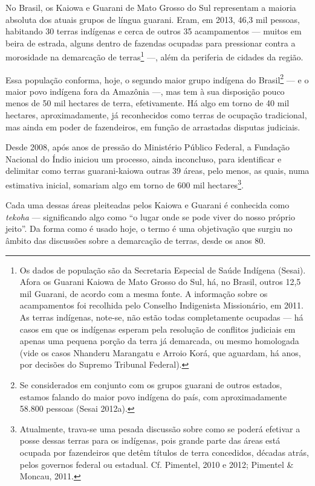 No Brasil, os Kaiowa e Guarani de Mato Grosso do Sul representam a
maioria absoluta dos atuais grupos de língua guarani. Eram, em 2013,
46,3 mil pessoas, habitando 30 terras indígenas e cerca de outros 35
acampamentos --- muitos em beira de estrada, alguns dentro de fazendas
ocupadas para pressionar contra a morosidade na demarcação de
terras\footnote{Os dados de população são da Secretaria Especial de
  Saúde Indígena (Sesai). Afora os Guarani Kaiowa de Mato Grosso do Sul,
  há, no Brasil, outros 12,5 mil Guarani, de acordo com a mesma fonte. A
  informação sobre os acampamentos foi recolhida pelo Conselho
  Indigenista Missionário, em 2011. As terras indígenas, note-se, não
  estão todas completamente ocupadas --- há casos em que os indígenas
  esperam pela resolução de conflitos judiciais em apenas uma pequena
  porção da terra já demarcada, ou mesmo homologada (vide os casos
  Nhanderu Marangatu e Arroio Korá, que aguardam, há anos, por decisões
  do Supremo Tribunal Federal).} ---, além da periferia de cidades da
região.

Essa população conforma, hoje, o segundo maior grupo indígena do
Brasil\footnote{Se considerados em conjunto com os grupos guarani de
  outros estados, estamos falando do maior povo indígena do país, com
  aproximadamente 58.800 pessoas (Sesai 2012a).} --- e o maior povo
indígena fora da Amazônia ---, mas tem à sua disposição pouco menos de
50 mil hectares de terra, efetivamente. Há algo em torno de 40 mil
hectares, aproximadamente, já reconhecidos como terras de ocupação
tradicional, mas ainda em poder de fazendeiros, em função de arrastadas
disputas judiciais.

Desde 2008, após anos de pressão do Ministério Público Federal, a
Fundação Nacional do Índio iniciou um processo, ainda inconcluso, para
identificar e delimitar como terras guarani-kaiowa outras 39 áreas, pelo
menos, as quais, numa estimativa inicial, somariam algo em torno de 600
mil hectares\footnote{Atualmente, trava-se uma pesada discussão sobre
  como se poderá efetivar a posse dessas terras para os indígenas, pois
  grande parte das áreas está ocupada por fazendeiros que detêm títulos
  de terra concedidos, décadas atrás, pelos governos federal ou
  estadual. Cf. Pimentel, 2010 e 2012; Pimentel \& Moncau, 2011.}.

Cada uma dessas áreas pleiteadas pelos Kaiowa e Guarani é conhecida como
\emph{tekoha} --- significando algo como ``o lugar onde se pode viver do
nosso próprio jeito''. Da forma como é usado hoje, o termo é uma
objetivação que surgiu no âmbito das discussões sobre a demarcação de
terras, desde os anos 80.

